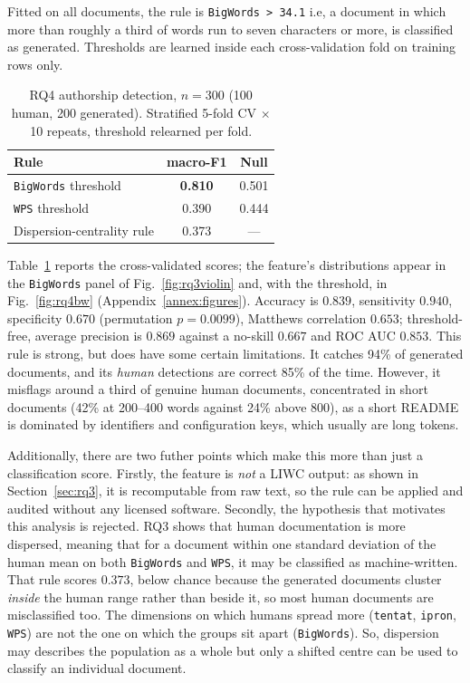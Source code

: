 \documentclass[conference]{IEEEtran}
\begin{document}
Fitted on all documents, the rule is \texttt{BigWords > 34.1} i.e, a document in which more than roughly a third of words run to seven characters or more, is classified as generated. Thresholds are learned inside each cross-validation fold on training rows only.
\begin{table}[htbp]
\caption{RQ4 authorship detection, $n=300$ (100 human, 200 generated).
Stratified 5-fold CV $\times$ 10 repeats, threshold relearned per fold.}
\label{tbl:rq4auth}
\begin{center}
\begin{tabular}{lcc}
\toprule
\textbf{Rule} & \textbf{macro-F1} & \textbf{Null} \\
\midrule
\texttt{BigWords} threshold   & \textbf{0.810} & 0.501 \\
\texttt{WPS} threshold        & 0.390 & 0.444 \\
Dispersion-centrality rule    & 0.373 & --- \\
\bottomrule
\end{tabular}
\end{center}
\end{table}

Table~\ref{tbl:rq4auth} reports the cross-validated scores; the feature's distributions appear in the \texttt{BigWords} panel of Fig.~\ref{fig:rq3violin} and, with the threshold, in Fig.~\ref{fig:rq4bw} (Appendix~\ref{annex:figures}). Accuracy is $0.839$, sensitivity $0.940$, specificity $0.670$ (permutation $p = 0.0099$), Matthews correlation $0.653$; threshold-free, average precision is $0.869$ against a no-skill $0.667$ and ROC AUC $0.853$. This rule is strong, but does have some certain limitations. It catches 94\% of generated documents, and its \emph{human} detections are correct 85\% of the time. However, it misflags around a third of genuine human documents, concentrated in short documents (42\% at 200--400 words against 24\% above 800), as a short README is dominated by identifiers and configuration keys, which usually are long tokens.

Additionally, there are two futher points which make this more than just a classification score. Firstly, the feature is \emph{not} a LIWC output: as shown in Section~\ref{sec:rq3}, it is recomputable from raw text, so the rule can be applied and audited without any licensed software. Secondly, the hypothesis that motivates this analysis is rejected. RQ3 shows that human documentation is more dispersed, meaning that for a document within one standard deviation of the human mean on both \texttt{BigWords} and \texttt{WPS}, it may be classified as machine-written. That rule scores $0.373$, below chance because the generated documents cluster \emph{inside} the human range rather than beside it, so most human documents are misclassified too. The dimensions on which humans spread more (\texttt{tentat}, \texttt{ipron}, \texttt{WPS}) are not the one on which the groups sit apart (\texttt{BigWords}). So, dispersion may describes the population as a whole but only a shifted centre can be used to classify an individual document.
\end{document}
